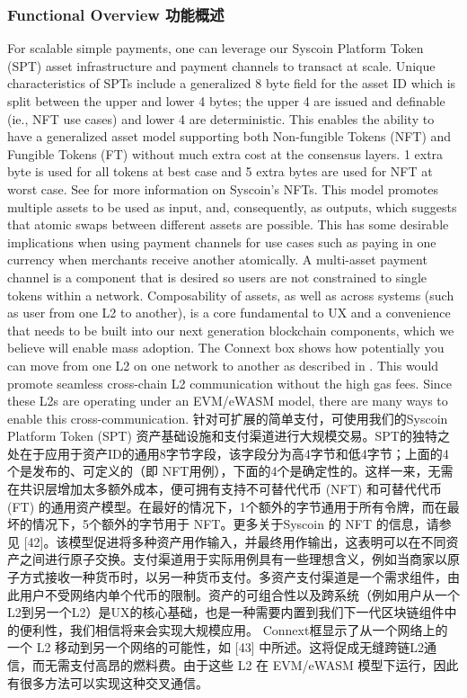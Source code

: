 \documentclass{ctexart}
\begin{document}
\subsubsection{Functional Overview 功能概述}

For scalable simple payments, one can leverage our Syscoin Platform Token (SPT) asset infrastructure and payment channels to transact at scale. Unique characteristics of SPTs include a generalized 8 byte field for the asset ID which is split between the upper and lower 4 bytes; the upper 4 are issued and definable (ie., NFT use cases) and lower 4 are deterministic. This enables the ability to have a generalized asset model supporting both Non-fungible Tokens (NFT) and Fungible Tokens (FT) without much extra cost at the consensus layers. 1 extra byte is used for all tokens at best case and 5 extra bytes are used for NFT at worst case. See \cite{NFT21} for more information on Syscoin’s NFTs. This model promotes multiple assets to be used as input, and, consequently, as outputs, which suggests that atomic swaps between different assets are possible. This has some desirable implications when using payment channels for use cases such as paying in one currency when merchants receive another atomically. A multi-asset payment channel is a component that is desired so users are not constrained to single tokens within a network. Composability of assets, as well as across systems (such as user from one L2 to another), is a core fundamental to UX and a convenience that needs to be built into our next generation blockchain components, which we believe will enable mass adoption. The Connext box shows how potentially you can move from one L2 on one network to another as described in \cite{Bhu21}. This would promote seamless cross-chain L2 communication without the high gas fees. Since these L2s are operating under an EVM/eWASM model, there are many ways to enable this cross-communication. 针对可扩展的简单支付，可使用我们的Syscoin Platform Token (SPT) 资产基础设施和支付渠道进行大规模交易。SPT的独特之处在于应用于资产ID的通用8字节字段，该字段分为高4字节和低4字节；上面的4个是发布的、可定义的（即 NFT用例），下面的4个是确定性的。这样一来，无需在共识层增加太多额外成本，便可拥有支持不可替代代币 (NFT) 和可替代代币 (FT) 的通用资产模型。在最好的情况下，1个额外的字节通用于所有令牌，而在最坏的情况下，5个额外的字节用于 NFT。更多关于Syscoin 的 NFT 的信息，请参见 [42]。该模型促进将多种资产用作输入，并最终用作输出，这表明可以在不同资产之间进行原子交换。支付渠道用于实际用例具有一些理想含义，例如当商家以原子方式接收一种货币时，以另一种货币支付。多资产支付渠道是一个需求组件，由此用户不受网络内单个代币的限制。资产的可组合性以及跨系统（例如用户从一个L2到另一个L2）是UX的核心基础，也是一种需要内置到我们下一代区块链组件中的便利性，我们相信将来会实现大规模应用。 Connext框显示了从一个网络上的一个 L2 移动到另一个网络的可能性，如 [43] 中所述。这将促成无缝跨链L2通信，而无需支付高昂的燃料费。由于这些 L2 在 EVM/eWASM 模型下运行，因此有很多方法可以实现这种交叉通信。
\end{document}
